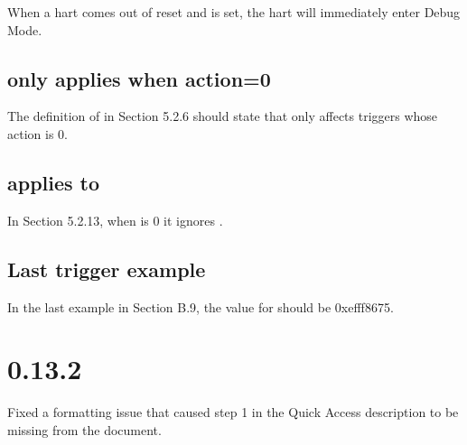When a hart comes out of reset and \Fhaltreq is set, the hart will immediately
enter Debug Mode.

\subsection{\Fmte only applies when action=0}

The definition of \Fmte in Section 5.2.6 should state that \Fmte only affects
triggers whose action is 0.

\subsection{\Fsselect applies to \Fsvalue}

In Section 5.2.13, when \Fsselect is 0 it ignores \Fsvalue.

\subsection{Last trigger example}

In the last example in Section B.9, the value for  should be
0xefff8675.

\section{0.13.2}

Fixed a formatting issue that caused step 1 in the Quick Access description to
be missing from the document.
